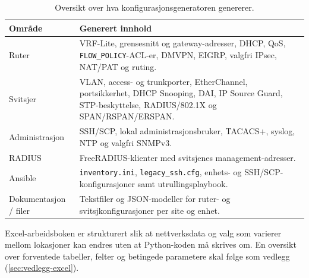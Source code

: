\begin{table}[H]
    \centering
    \caption{Oversikt over hva konfigurasjonsgeneratoren genererer.}
    \label{tab:generator-output}
    \small
    \renewcommand{\arraystretch}{1.35}
    \setlength{\tabcolsep}{5pt}
    \begin{tabular}{
        >{\raggedright\arraybackslash}p{2.8cm}
        >{\raggedright\arraybackslash}p{12cm}
    }
        \toprule
        \rowcolor{tablegreen}
        \color{white}\textbf{Område} &
        \color{white}\textbf{Generert innhold} \\
        \midrule

        Ruter &
        VRF-Lite, grensesnitt og gateway-adresser, DHCP, QoS, \texttt{FLOW\_POLICY}-ACL-er, DMVPN, EIGRP, valgfri IPsec, NAT/PAT og ruting. \\
        \addlinespace[2pt]

        Svitsjer &
        VLAN, access- og trunkporter, EtherChannel, portsikkerhet, DHCP Snooping, DAI, IP Source Guard, STP-beskyttelse, RADIUS/802.1X og SPAN/RSPAN/ERSPAN. \\
        \addlinespace[2pt]

        Administrasjon &
        SSH/SCP, lokal administrasjonsbruker, TACACS+, syslog, NTP og valgfri SNMPv3. \\
        \addlinespace[2pt]

        RADIUS &
        FreeRADIUS-klienter med svitsjenes management-adresser. \\
        \addlinespace[2pt]

        Ansible &
        \texttt{inventory.ini}, \texttt{legacy\_ssh.cfg}, enhets- og SSH/SCP-konfigurasjoner samt utrullingsplaybook. \\
        \addlinespace[2pt]

        Dokumentasjon / filer &
        Tekstfiler og JSON-modeller for ruter- og svitsjkonfigurasjoner per site og enhet. \\

        \bottomrule
    \end{tabular}
\end{table}

Excel-arbeidsboken er strukturert slik at nettverksdata og valg som varierer mellom lokasjoner kan endres uten at Python-koden må skrives om. En oversikt over forventede tabeller, felter og betingede parametere skal følge som vedlegg (\ref{sec:vedlegg-excel}).

